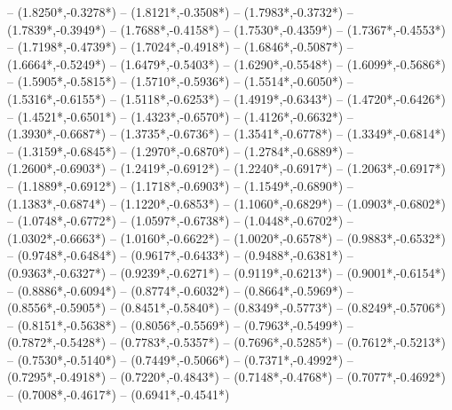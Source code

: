 {	-- ({1.8250*\dx},{-0.3278*\dy})
	-- ({1.8121*\dx},{-0.3508*\dy})
	-- ({1.7983*\dx},{-0.3732*\dy})
	-- ({1.7839*\dx},{-0.3949*\dy})
	-- ({1.7688*\dx},{-0.4158*\dy})
	-- ({1.7530*\dx},{-0.4359*\dy})
	-- ({1.7367*\dx},{-0.4553*\dy})
	-- ({1.7198*\dx},{-0.4739*\dy})
	-- ({1.7024*\dx},{-0.4918*\dy})
	-- ({1.6846*\dx},{-0.5087*\dy})
	-- ({1.6664*\dx},{-0.5249*\dy})
	-- ({1.6479*\dx},{-0.5403*\dy})
	-- ({1.6290*\dx},{-0.5548*\dy})
	-- ({1.6099*\dx},{-0.5686*\dy})
	-- ({1.5905*\dx},{-0.5815*\dy})
	-- ({1.5710*\dx},{-0.5936*\dy})
	-- ({1.5514*\dx},{-0.6050*\dy})
	-- ({1.5316*\dx},{-0.6155*\dy})
	-- ({1.5118*\dx},{-0.6253*\dy})
	-- ({1.4919*\dx},{-0.6343*\dy})
	-- ({1.4720*\dx},{-0.6426*\dy})
	-- ({1.4521*\dx},{-0.6501*\dy})
	-- ({1.4323*\dx},{-0.6570*\dy})
	-- ({1.4126*\dx},{-0.6632*\dy})
	-- ({1.3930*\dx},{-0.6687*\dy})
	-- ({1.3735*\dx},{-0.6736*\dy})
	-- ({1.3541*\dx},{-0.6778*\dy})
	-- ({1.3349*\dx},{-0.6814*\dy})
	-- ({1.3159*\dx},{-0.6845*\dy})
	-- ({1.2970*\dx},{-0.6870*\dy})
	-- ({1.2784*\dx},{-0.6889*\dy})
	-- ({1.2600*\dx},{-0.6903*\dy})
	-- ({1.2419*\dx},{-0.6912*\dy})
	-- ({1.2240*\dx},{-0.6917*\dy})
	-- ({1.2063*\dx},{-0.6917*\dy})
	-- ({1.1889*\dx},{-0.6912*\dy})
	-- ({1.1718*\dx},{-0.6903*\dy})
	-- ({1.1549*\dx},{-0.6890*\dy})
	-- ({1.1383*\dx},{-0.6874*\dy})
	-- ({1.1220*\dx},{-0.6853*\dy})
	-- ({1.1060*\dx},{-0.6829*\dy})
	-- ({1.0903*\dx},{-0.6802*\dy})
	-- ({1.0748*\dx},{-0.6772*\dy})
	-- ({1.0597*\dx},{-0.6738*\dy})
	-- ({1.0448*\dx},{-0.6702*\dy})
	-- ({1.0302*\dx},{-0.6663*\dy})
	-- ({1.0160*\dx},{-0.6622*\dy})
	-- ({1.0020*\dx},{-0.6578*\dy})
	-- ({0.9883*\dx},{-0.6532*\dy})
	-- ({0.9748*\dx},{-0.6484*\dy})
	-- ({0.9617*\dx},{-0.6433*\dy})
	-- ({0.9488*\dx},{-0.6381*\dy})
	-- ({0.9363*\dx},{-0.6327*\dy})
	-- ({0.9239*\dx},{-0.6271*\dy})
	-- ({0.9119*\dx},{-0.6213*\dy})
	-- ({0.9001*\dx},{-0.6154*\dy})
	-- ({0.8886*\dx},{-0.6094*\dy})
	-- ({0.8774*\dx},{-0.6032*\dy})
	-- ({0.8664*\dx},{-0.5969*\dy})
	-- ({0.8556*\dx},{-0.5905*\dy})
	-- ({0.8451*\dx},{-0.5840*\dy})
	-- ({0.8349*\dx},{-0.5773*\dy})
	-- ({0.8249*\dx},{-0.5706*\dy})
	-- ({0.8151*\dx},{-0.5638*\dy})
	-- ({0.8056*\dx},{-0.5569*\dy})
	-- ({0.7963*\dx},{-0.5499*\dy})
	-- ({0.7872*\dx},{-0.5428*\dy})
	-- ({0.7783*\dx},{-0.5357*\dy})
	-- ({0.7696*\dx},{-0.5285*\dy})
	-- ({0.7612*\dx},{-0.5213*\dy})
	-- ({0.7530*\dx},{-0.5140*\dy})
	-- ({0.7449*\dx},{-0.5066*\dy})
	-- ({0.7371*\dx},{-0.4992*\dy})
	-- ({0.7295*\dx},{-0.4918*\dy})
	-- ({0.7220*\dx},{-0.4843*\dy})
	-- ({0.7148*\dx},{-0.4768*\dy})
	-- ({0.7077*\dx},{-0.4692*\dy})
	-- ({0.7008*\dx},{-0.4617*\dy})
	-- ({0.6941*\dx},{-0.4541*\dy})
}
